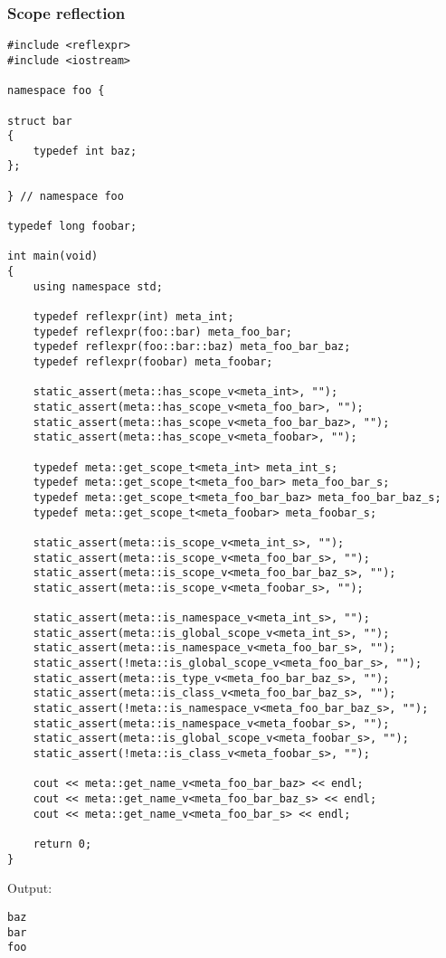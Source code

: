 \subsubsection{Scope reflection}

\begin{verbatim}
#include <reflexpr>
#include <iostream>

namespace foo {

struct bar
{
	typedef int baz;
};

} // namespace foo

typedef long foobar;

int main(void)
{
	using namespace std;

	typedef reflexpr(int) meta_int;
	typedef reflexpr(foo::bar) meta_foo_bar;
	typedef reflexpr(foo::bar::baz) meta_foo_bar_baz;
	typedef reflexpr(foobar) meta_foobar;

	static_assert(meta::has_scope_v<meta_int>, "");
	static_assert(meta::has_scope_v<meta_foo_bar>, "");
	static_assert(meta::has_scope_v<meta_foo_bar_baz>, "");
	static_assert(meta::has_scope_v<meta_foobar>, "");

	typedef meta::get_scope_t<meta_int> meta_int_s;
	typedef meta::get_scope_t<meta_foo_bar> meta_foo_bar_s;
	typedef meta::get_scope_t<meta_foo_bar_baz> meta_foo_bar_baz_s;
	typedef meta::get_scope_t<meta_foobar> meta_foobar_s;

	static_assert(meta::is_scope_v<meta_int_s>, "");
	static_assert(meta::is_scope_v<meta_foo_bar_s>, "");
	static_assert(meta::is_scope_v<meta_foo_bar_baz_s>, "");
	static_assert(meta::is_scope_v<meta_foobar_s>, "");

	static_assert(meta::is_namespace_v<meta_int_s>, "");
	static_assert(meta::is_global_scope_v<meta_int_s>, "");
	static_assert(meta::is_namespace_v<meta_foo_bar_s>, "");
	static_assert(!meta::is_global_scope_v<meta_foo_bar_s>, "");
	static_assert(meta::is_type_v<meta_foo_bar_baz_s>, "");
	static_assert(meta::is_class_v<meta_foo_bar_baz_s>, "");
	static_assert(!meta::is_namespace_v<meta_foo_bar_baz_s>, "");
	static_assert(meta::is_namespace_v<meta_foobar_s>, "");
	static_assert(meta::is_global_scope_v<meta_foobar_s>, "");
	static_assert(!meta::is_class_v<meta_foobar_s>, "");

	cout << meta::get_name_v<meta_foo_bar_baz> << endl;
	cout << meta::get_name_v<meta_foo_bar_baz_s> << endl;
	cout << meta::get_name_v<meta_foo_bar_s> << endl;

	return 0;
}
\end{verbatim}

Output:

\begin{verbatim}
baz
bar
foo
\end{verbatim}

